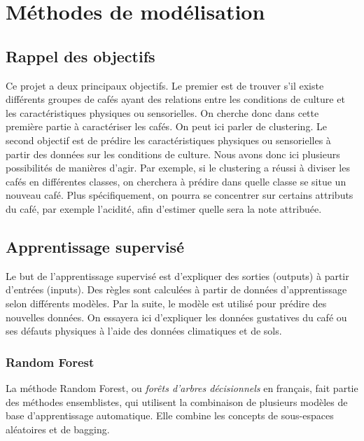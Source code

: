 
\chapter{Méthodes de modélisation}
\section{Rappel des objectifs}\label{obj}
Ce projet a deux principaux objectifs. Le premier est de trouver s'il existe différents groupes de cafés ayant des relations entre les conditions de culture et les caractéristiques physiques ou sensorielles. On cherche donc dans cette première partie à caractériser les cafés. On peut ici parler de clustering.  Le second objectif est de prédire les caractéristiques physiques ou sensorielles à partir des données sur les conditions de culture. Nous avons donc ici plusieurs possibilités de manières d'agir. Par exemple, si le clustering a réussi à diviser les cafés en différentes classes, on cherchera à prédire dans quelle classe se situe un nouveau café. Plus spécifiquement, on pourra se concentrer sur certains attributs du café, par exemple l'acidité, afin d'estimer quelle sera la note attribuée. 


\section{Apprentissage supervisé}
Le but de l'apprentissage supervisé est d'expliquer des sorties (outputs) à partir d'entrées (inputs). Des règles sont calculées à partir de données d'apprentissage selon différents modèles. Par la suite, le modèle est utilisé pour prédire des nouvelles données. On essayera ici d'expliquer les données gustatives du café ou ses défauts physiques à l'aide des données climatiques et de sols. 


\subsection{Random Forest}

La méthode Random Forest, ou \textit{forêts d'arbres décisionnels} en français, fait partie des méthodes ensemblistes\cite{EnsembleMethods}, qui utilisent la combinaison de plusieurs modèles de base d'apprentissage automatique. Elle combine les concepts de sous-espaces aléatoires et de bagging.\\

